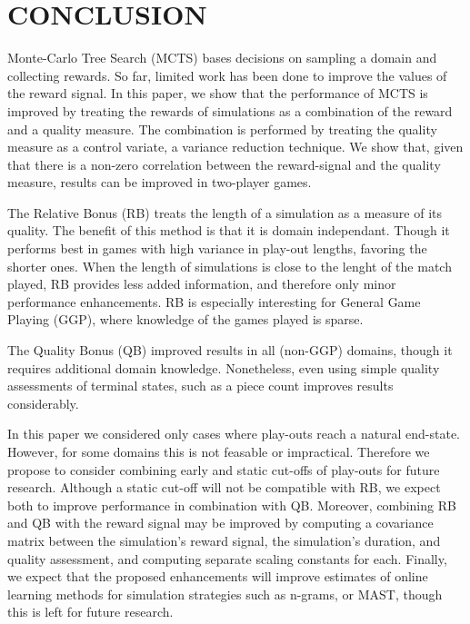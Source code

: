 \documentclass{ecai2014}
\begin{document}
\section{CONCLUSION}
\label{sec:concl}
Monte-Carlo Tree Search (MCTS) bases decisions on sampling a domain and collecting rewards. So far, limited work has been done to improve the values of the reward signal. In this paper, we show that the performance of MCTS is improved by treating the rewards of simulations as a combination of the reward and a quality measure. The combination is performed by treating the quality measure as a control variate, a variance reduction technique. We show that, given that there is a non-zero correlation between the reward-signal and the quality measure, results can be improved in two-player games.

The Relative Bonus (RB) treats the length of a simulation as a measure of its quality. The benefit of this method is that it is domain independant. Though it performs best in games with high variance in play-out lengths, favoring the shorter ones. When the length of simulations is close to the lenght of the match played, RB provides less added information, and therefore only minor performance enhancements. RB is especially interesting for General Game Playing (GGP), where knowledge of the games played is sparse.

The Quality Bonus (QB) improved results in all (non-GGP) domains, though it requires additional domain knowledge. Nonetheless, even using simple quality assessments of terminal states, such as a piece count improves results considerably.

In this paper we considered only cases where play-outs reach a natural end-state. However, for some domains this is not feasable or impractical. Therefore we propose to consider combining early and static cut-offs of play-outs for future research. Although a static cut-off will not be compatible with RB, we expect both to improve performance in combination with QB. Moreover, combining RB and QB with the reward signal may be improved by computing a covariance matrix between the simulation's reward signal, the simulation's duration, and quality assessment, and computing separate scaling constants for each. Finally, we expect that the proposed enhancements will improve estimates of online learning methods for simulation strategies such as n-grams, or MAST, though this is left for future research.



\end{document}
